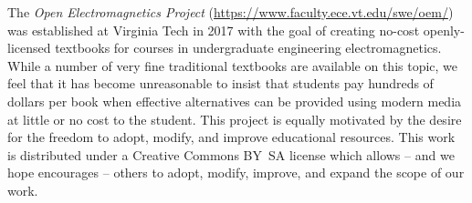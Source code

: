 

\label{m0148_Preface-About_OpenEM} %

The \emph{Open Electromagnetics Project} 
(\href{https://www.faculty.ece.vt.edu/swe/oem/}{https://www.faculty.ece.vt.edu/swe/oem/}) 
was established at Virginia Tech in 2017 with the goal of creating no-cost openly-licensed textbooks for courses in undergraduate engineering electromagnetics.
While a number of very fine traditional textbooks are available on this topic, we feel that it has become unreasonable to insist that students pay hundreds of dollars per book when effective alternatives can be provided using modern media at little or no cost to the student.
This project is equally motivated by the desire for the freedom to adopt, modify, and improve educational resources.
This work is distributed under a Creative Commons BY~SA license which allows -- and we hope encourages -- others to adopt, modify, improve, and expand the scope of our work.



